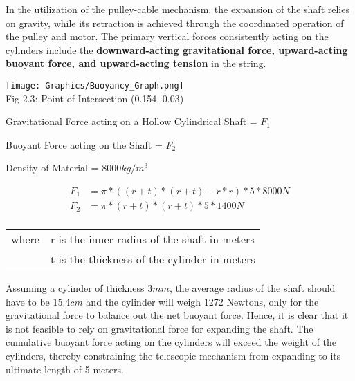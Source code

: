 \documentclass[a4,10pt]{report}
\begin{document}
In the utilization of the pulley-cable mechanism, the expansion of the shaft relies on gravity, while its retraction is achieved through the coordinated operation of the pulley and motor. The primary vertical forces consistently acting on the cylinders include the \textbf{downward-acting gravitational force, upward-acting buoyant force, and upward-acting tension} in the string. \\
\begin{center}
    \texttt{[image: Graphics/Buoyancy\_Graph.png]} \\
    \normalsize{Fig 2.3: Point of Intersection (0.154, 0.03)}
\end{center}
\par Gravitational Force acting on a Hollow Cylindrical Shaft = $F_1$ 
\par Buoyant Force acting on the Shaft = $F_2$
\par Density of Material = $8000 kg/m^3$

\begin{equation*}
    \begin{split} 
        F_1 &= \pi*((r+t)*(r+t)-r*r)*5*8000 N \\
        F_2 &= \pi*(r+t)*(r+t)*5*1400 N \\
    \end{split}
\end{equation*}
\begin{tabular}{r l}
where &r is the inner radius of the shaft in meters \\
&t is the thickness of the cylinder in meters \\
\end{tabular}
\par Assuming a cylinder of thickness $3 mm$, the average radius of the shaft should have to be $15.4 cm$ and the cylinder will weigh 1272 Newtons, only for the gravitational force to balance out the net buoyant force. Hence, it is clear that it is not feasible to rely on gravitational force for expanding the shaft. The cumulative buoyant force acting on the cylinders will exceed the weight of the cylinders, thereby constraining the telescopic mechanism from expanding to its ultimate length of 5 meters.
\end{document}
